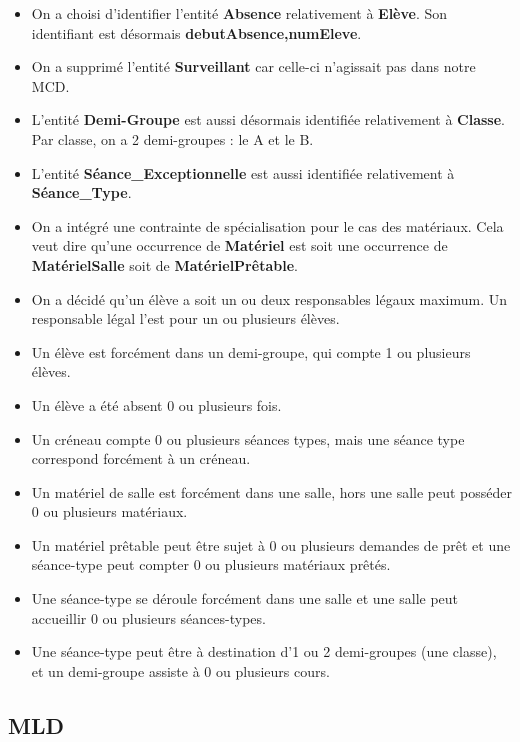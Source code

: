 \documentclass[12pt,french,titlepage]{article}
\begin{document}
	  \begin{itemize}
	      \item On a choisi d'identifier l'entité \textbf{Absence} relativement à \textbf{Elève}. Son identifiant est désormais \textbf{debutAbsence,numEleve}. 
	      \item On a supprimé l'entité \textbf{Surveillant }car celle-ci n'agissait pas dans notre MCD.
	      \item L'entité \textbf{Demi-Groupe} est aussi désormais identifiée relativement à \textbf{Classe}. Par classe, on a 2 demi-groupes : le A et le B.
	      \item L'entité \textbf{Séance\_Exceptionnelle} est aussi identifiée relativement à \textbf{Séance\_Type}. 
	      \item On a intégré une contrainte de spécialisation pour le cas des matériaux. Cela veut dire qu'une occurrence de \textbf{Matériel} est soit une occurrence de \textbf{MatérielSalle} soit de \textbf{MatérielPrêtable}.
	      \item On a décidé qu'un élève a soit un ou deux responsables légaux maximum. Un responsable légal l'est pour un ou plusieurs élèves.
	      \item Un élève est forcément dans un demi-groupe, qui compte 1 ou plusieurs élèves.
	      \item Un élève a été absent 0 ou plusieurs fois.
	      \item Un créneau compte 0 ou plusieurs séances types, mais une séance type correspond forcément à un créneau.
	      \item Un matériel de salle est forcément dans une salle, hors une salle peut posséder 0 ou plusieurs matériaux.
	      \item Un matériel prêtable peut être sujet à 0 ou plusieurs demandes de prêt et une séance-type peut compter 0 ou plusieurs matériaux prêtés.
	      \item Une séance-type se déroule forcément dans une salle et une salle peut accueillir 0 ou plusieurs séances-types.
	      \item Une séance-type peut être à destination d'1 ou 2 demi-groupes (une classe), et un demi-groupe assiste à 0 ou plusieurs cours.
	  \end{itemize}
	  
	  \subsection{MLD}
	  
\end{document}
